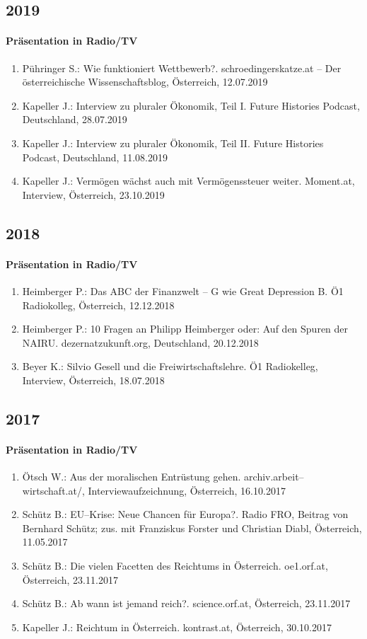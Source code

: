 \subsection*{2019}
\paragraph{Präsentation in Radio/TV}
\begin{enumerate}
	\item Pühringer S.: Wie funktioniert Wettbewerb?. schroedingerskatze.at -- Der österreichische Wissenschaftsblog, Österreich, 12.07.2019
	\item Kapeller J.: Interview zu pluraler Ökonomik, Teil I. Future Histories Podcast, Deutschland, 28.07.2019
	\item Kapeller J.: Interview zu pluraler Ökonomik, Teil II. Future Histories Podcast, Deutschland, 11.08.2019
	\item Kapeller J.: Vermögen wächst auch mit Vermögenssteuer weiter. Moment.at, Interview, Österreich, 23.10.2019
\end{enumerate}
\subsection*{2018}
\paragraph{Präsentation in Radio/TV}
\begin{enumerate}
	\item Heimberger P.: Das ABC der Finanzwelt -- G wie Great Depression B. Ö1 Radiokolleg, Österreich, 12.12.2018
	\item Heimberger P.: 10 Fragen an Philipp Heimberger oder: Auf den Spuren der NAIRU. dezernatzukunft.org, Deutschland, 20.12.2018
	\item Beyer K.: Silvio Gesell und die Freiwirtschaftslehre. Ö1 Radiokelleg, Interview, Österreich, 18.07.2018
\end{enumerate}
\subsection*{2017}
\paragraph{Präsentation in Radio/TV}
\begin{enumerate}
	\item Ötsch W.: Aus der moralischen Entrüstung gehen. archiv.arbeit--wirtschaft.at/, Interviewaufzeichnung, Österreich, 16.10.2017
	\item Schütz B.: EU--Krise: Neue Chancen für Europa?. Radio FRO, Beitrag von Bernhard Schütz; zus. mit Franziskus Forster und Christian Diabl, Österreich, 11.05.2017
	\item Schütz B.: Die vielen Facetten des Reichtums in Österreich. oe1.orf.at, Österreich, 23.11.2017
	\item Schütz B.: Ab wann ist jemand reich?. science.orf.at, Österreich, 23.11.2017
	\item Kapeller J.: Reichtum in Österreich. kontrast.at, Österreich, 30.10.2017
\end{enumerate}
